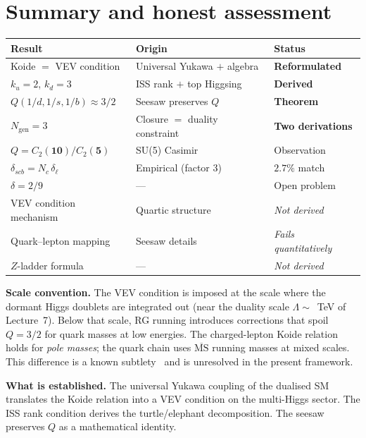 \documentclass[11pt,a4paper]{article}
\newcommand{\Nc}{N_{\!c}}
\theoremstyle{definition}\newtheorem{exercise}{Exercise}[section]
\begin{document}
\section{Summary and honest assessment}
\label{sec:summary}

\begin{center}
\renewcommand{\arraystretch}{1.3}
\begin{tabular}{lll}
\toprule
\textbf{Result} & \textbf{Origin} & \textbf{Status} \\
\midrule
Koide $=$ VEV condition & Universal Yukawa $+$ algebra
  & \textbf{Reformulated} \\
$k_u = 2$, $k_d = 3$ & ISS rank $+$ top Higgsing
  & \textbf{Derived} \\
$Q(1/d,1/s,1/b) \approx 3/2$ & Seesaw preserves $Q$
  & \textbf{Theorem} \\
$N_{\text{gen}} = 3$ & Closure $=$ duality constraint
  & \textbf{Two derivations} \\
\midrule
$Q = C_2(\mathbf{10})/C_2(\mathbf{5})$ & SU(5) Casimir
  & Observation \\
$\delta_{scb} = \Nc\,\delta_\ell$ & Empirical (factor 3)
  & $2.7\%$ match \\
$\delta = 2/9$ & --- & Open problem \\
\midrule
VEV condition mechanism & Quartic structure
  & \emph{Not derived} \\
Quark--lepton mapping & Seesaw details
  & \emph{Fails quantitatively} \\
$Z$-ladder formula & ---
  & \emph{Not derived} \\
\bottomrule
\end{tabular}
\end{center}

\textbf{Scale convention.}  The VEV condition is imposed at
the scale where the dormant Higgs doublets are integrated out
(near the duality scale $\Lambda \sim$~TeV of Lecture~7).
Below that scale, RG running introduces corrections that spoil
$Q = 3/2$ for quark masses at low energies.  The charged-lepton
Koide relation holds for \emph{pole masses}; the quark
chain uses $\overline{\text{MS}}$ running masses at mixed scales.
This difference is a known subtlety~\cite{Sumino2009} and is
unresolved in the present framework.

\textbf{What is established.}  The universal Yukawa coupling of
the dualised SM translates the Koide relation into a VEV
condition on the multi-Higgs sector.  The ISS rank
condition derives the turtle/elephant decomposition.  The seesaw
preserves $Q$ as a mathematical identity.
\end{document}
